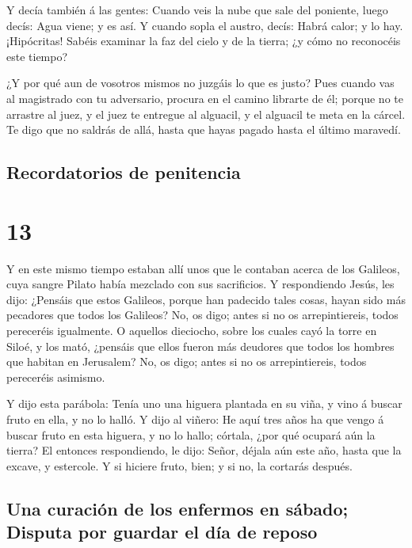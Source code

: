  Y decía también á las gentes: Cuando veis la nube que
sale del poniente, luego decís: Agua viene; y es así.  Y
cuando sopla el austro, decís: Habrá calor; y lo hay. 
¡Hipócritas! Sabéis examinar la faz del cielo y de la tierra; ¿y cómo no
reconocéis este tiempo?

 ¿Y por qué aun de vosotros mismos no juzgáis lo que es
justo?  Pues cuando vas al magistrado con tu adversario,
procura en el camino librarte de él; porque no te arrastre al juez, y el
juez te entregue al alguacil, y el alguacil te meta en la cárcel.
 Te digo que no saldrás de allá, hasta que hayas pagado
hasta el último maravedí.

\hypertarget{recordatorios-de-penitencia}{%
\subsection{Recordatorios de
penitencia}\label{recordatorios-de-penitencia}}

\hypertarget{section-42-13}{%
\section{13}\label{section-42-13}}

 Y en este mismo tiempo estaban allí unos que le contaban
acerca de los Galileos, cuya sangre Pilato había mezclado con sus
sacrificios.  Y respondiendo Jesús, les dijo: ¿Pensáis que
estos Galileos, porque han padecido tales cosas, hayan sido más
pecadores que todos los Galileos?  No, os digo; antes si
no os arrepintiereis, todos pereceréis igualmente.  O
aquellos dieciocho, sobre los cuales cayó la torre en Siloé, y los mató,
¿pensáis que ellos fueron más deudores que todos los hombres que habitan
en Jerusalem?  No, os digo; antes si no os arrepintiereis,
todos pereceréis asimismo.

 Y dijo esta parábola: Tenía uno una higuera plantada en
su viña, y vino á buscar fruto en ella, y no lo halló.  Y
dijo al viñero: He aquí tres años ha que vengo á buscar fruto en esta
higuera, y no lo hallo; córtala, ¿por qué ocupará aún la tierra?
 El entonces respondiendo, le dijo: Señor, déjala aún este
año, hasta que la excave, y estercole.  Y si hiciere
fruto, bien; y si no, la cortarás después.

\hypertarget{una-curaciuxf3n-de-los-enfermos-en-suxe1bado-disputa-por-guardar-el-duxeda-de-reposo}{%
\subsection{Una curación de los enfermos en sábado; Disputa por guardar
el día de
reposo}\label{una-curaciuxf3n-de-los-enfermos-en-suxe1bado-disputa-por-guardar-el-duxeda-de-reposo}}

